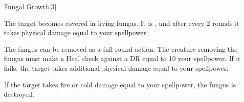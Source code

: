 \begin{spellsection}{Fungal Growth}[3]
    \begin{spellheader}
    \end{spellheader}
    \begin{spellcontent}
        \begin{spelltargetinginfo}
        \end{spelltargetinginfo}
        \begin{spelleffects}
            \spelleffect The target becomes covered in living fungus. It is \sickened, and after every 2 rounds it takes physical damage equal to your spellpower.

            The fungus can be removed as a full-round action. The creature removing the fungus must make a Heal check against a DR equal to 10 \add your spellpower. If it fails, the target takes additional physical damage equal to your spellpower.

            If the target takes fire or cold damage equal to your spellpower, the fungus is destroyed.
        \end{spelleffects}
    \end{spellcontent}
    \begin{spellfooter}
        \miscastexplode
    \end{spellfooter}
    \begin{spellaugments}
    \end{spellaugments}
\end{spellsection}



